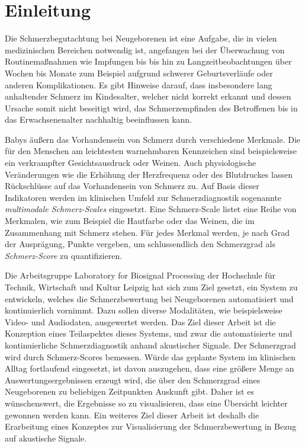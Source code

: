 \chapter{Einleitung}

Die Schmerzbegutachtung bei Neugeborenen ist eine Aufgabe, die in vielen medizinischen Bereichen notwendig ist, angefangen bei der Überwachung von Routinemaßnahmen wie Impfungen bis bis hin zu Langzeitbeobachtungen über Wochen bis Monate zum Beispiel aufgrund schwerer Geburtsverläufe oder anderen Komplikationen. Es gibt Hinweise darauf, dass insbesondere lang anhaltender Schmerz im Kindesalter, welcher nicht korrekt erkannt und dessen Ursache somit nicht beseitigt wird, das Schmerzempfinden des Betroffenen bis in das Erwachsenenalter nachhaltig beeinflussen kann.\cite[S. 402]{PainAssessment03}

Babys äußern das Vorhandensein von Schmerz durch verschiedene Merkmale. Die für den Menschen am leichtesten warnehmbaren Kennzeichen sind beispielsweise ein verkrampfter Gesichtsausdruck oder Weinen. Auch physiologische Veränderungen wie die Erhöhung der Herzfrequenz oder des Blutdruckes lassen Rückschlüsse auf das Vorhandensein von Schmerz zu.\cite[S. 440]{PainAssessment01} Auf Basis dieser Indikatoren werden im klinischen Umfeld zur Schmerzdiagnostik sogenannte \emph{multimodale Schmerz-Scales} eingesetzt. Eine Schmerz-Scale listet eine Reihe von Merkmalen, wie zum Beispiel die Hautfarbe oder das Weinen, die im Zusammenhang mit Schmerz stehen. Für jedes Merkmal werden, je nach Grad der Ausprägung, Punkte vergeben, um schlussendlich den Schmerzgrad als \emph{Schmerz-Score} zu quantifizieren.\cite[S. 406]{PainAssessment03}

Die Arbeitsgruppe \glqq Laboratory for Biosignal Processing\grqq{} der Hochschule für Technik, Wirtschaft und Kultur Leipzig hat sich zum Ziel gesetzt, ein System zu entwickeln, welches die Schmerzbewertung bei Neugeborenen automatisiert und kontinuierlich vornimmt. Dazu sollen diverse Modalitäten, wie beispielsweise Video- und Audiodaten, ausgewertet werden. Das Ziel dieser Arbeit ist die Konzeption eines Teilaspektes dieses Systems, und zwar die automatisierte und kontinuierliche Schmerzdiagnostik anhand akustischer Signale. Der Schmerzgrad wird durch Schmerz-Scores bemessen. Würde das geplante System im klinischen Alltag fortlaufend eingesetzt, ist davon auszugehen, dass eine größere Menge an Auswertungsergebnissen erzeugt wird, die über den Schmerzgrad eines Neugeborenen zu beliebigen Zeitpunkten Auskunft gibt. Daher ist es wünschenswert, die Ergebnisse so zu visualisieren, dass eine Übersicht leichter gewonnen werden kann. Ein weiteres Ziel dieser Arbeit ist deshalb die Erarbeitung eines Konzeptes zur Visualisierung der Schmerzbewertung in Bezug auf akustische Signale.

